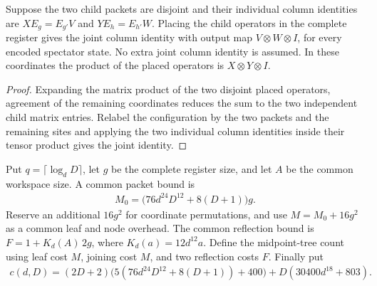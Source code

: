 \begin{lemma}
    \label{thm:mpu_joint_child_columns}
    \leanok
    Suppose the two child packets are disjoint and their individual
    column identities are $XE_g=E_{g'}V$ and $YE_h=E_{h'}W$.
    Placing the child operators in the complete register gives the
    joint column identity with output map $V\otimes W\otimes I$,
    for every encoded spectator state. No extra joint column identity
    is assumed. In these coordinates the product of the placed
    operators is $X\otimes Y\otimes I$.
\end{lemma}
\begin{proof}\leanok
    Expanding the matrix product of the two disjoint placed operators,
    agreement of the remaining coordinates reduces the sum to the two
    independent child matrix entries. Relabel the configuration by the
    two packets and the remaining sites and applying the two individual
    column identities inside their tensor product gives the joint identity.
\end{proof}

\begin{definition}
    \label{def:mpu_uniform_numeric_resources}
    \leanok
    Put $q=\lceil\log_dD\rceil$, let $g$ be the complete register size,
    and let $A$ be the common workspace size. A common packet bound is
    \begin{align}
        M_0=\bigl(76d^{24}D^{12}+8(D+1)\bigr)g.
    \end{align}
    Reserve an additional $16g^2$ for coordinate permutations, and use
    $M=M_0+16g^2$ as a common leaf and node overhead. The common
    reflection bound is $F=1+K_d(A)\,2g$, where
    $K_d(a)=12d^{12}a$.
    Define the midpoint-tree count using leaf cost $M$, joining cost
    $M$, and two reflection costs $F$. Finally put
    \begin{align}
        c(d,D)=(2D+2)\bigl(5(76d^{24}D^{12}+8(D+1))+400\bigr)
        +D(30400d^{18}+803).
    \end{align}
\end{definition}

